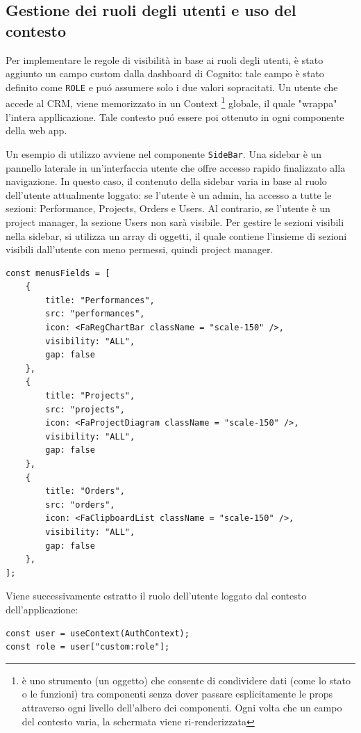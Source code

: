 \documentclass[target=bach,aauheader=,style=]{thud}
\begin{document}
\subsection{Gestione dei ruoli degli utenti e uso del contesto}
Per implementare le regole di visibilità in base ai ruoli degli utenti, è stato aggiunto un campo custom dalla dashboard di Cognito: tale campo è stato definito come \texttt{ROLE} e puó assumere solo i due valori sopracitati. Un utente che accede al CRM, viene memorizzato in un Context \footnote{è uno strumento (un oggetto) che consente di condividere dati (come lo stato o le funzioni) tra componenti senza dover passare esplicitamente le props attraverso ogni livello dell'albero dei componenti. Ogni volta che un campo del contesto varia, la schermata viene ri-renderizzata} globale, il quale "wrappa" l'intera appllicazione. Tale contesto puó essere poi ottenuto in ogni componente della web app. 

\noindent Un esempio di utilizzo avviene nel componente \texttt{SideBar}. Una sidebar è un pannello laterale in un'interfaccia utente che offre accesso rapido finalizzato alla navigazione. In questo caso, il contenuto della sidebar varia in base al ruolo dell'utente attualmente loggato: se l'utente è un admin, ha accesso a tutte le sezioni: Performance, Projects, Orders e Users. Al contrario, se l'utente è un project manager, la sezione Users non sarà visibile. Per gestire le sezioni visibili nella sidebar, si utilizza un array di oggetti, il quale contiene l'insieme di sezioni visibili dall'utente con meno permessi, quindi project manager. 

\begin{lstlisting}[caption=Campi default visibili nella sidebar]
const menusFields = [
    {
        title: "Performances",
        src: "performances",
        icon: <FaRegChartBar className = "scale-150" />,
        visibility: "ALL",
        gap: false
    },
    {
        title: "Projects",
        src: "projects",
        icon: <FaProjectDiagram className = "scale-150" />,
        visibility: "ALL",
        gap: false
    },
    {
        title: "Orders",
        src: "orders",
        icon: <FaClipboardList className = "scale-150" />,
        visibility: "ALL",
        gap: false
    },
];
\end{lstlisting}

\noindent Viene successivamente estratto il ruolo dell'utente loggato dal contesto dell'applicazione:

\begin{lstlisting}[caption=Parte del file \texttt{AuthenticatedLayout.tsx} del CRM]
const user = useContext(AuthContext);
const role = user["custom:role"];
\end{lstlisting}
\end{document}

